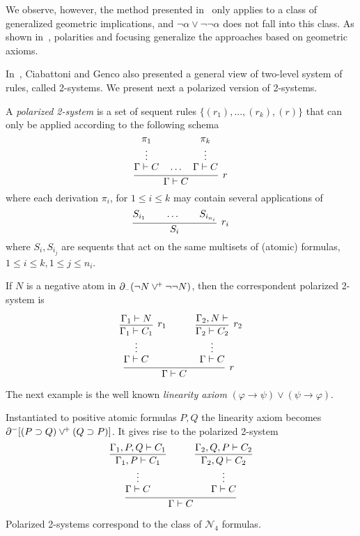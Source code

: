 We observe, however, the method presented in~\cite{Neg16}  only applies to a class of
generalized geometric implications, and $\neg \alpha\vee\neg\neg\alpha$ does not fall into this class. As shown in~\cite{DBLP:journals/apal/MarinMPV22}, polarities and focusing generalize the approaches based on geometric axioms.

In~\cite{DBLP:journals/tocl/CiabattoniG18}, Ciabattoni and Genco also presented a general view of two-level system of rules, called 2-systems. We present next a polarized version of 2-systems.
\begin{definition}
A  {\em polarized 2-system} is a set of sequent rules $\{(r_1), . . . , (r_k ), (r)\}$ that can only be applied according to the following schema
\[
\infer[r]{\Gamma\vdash C}
      {\deduce{\Gamma\vdash C\strut}
              {\deduce{\vdots}
                      {\pi_1}}\quad\ldots\quad
       \deduce{\Gamma\vdash C\strut}
              {\deduce{\vdots}
                      {\pi_k}}}
\]
where each derivation $\pi_i$, for $1\leq i \leq k$ may contain several applications of
\[
\infer[r_i]{S_i}
{S_{i_1}\qquad\ldots\qquad S_{i_{n_i}}}
\]
where $S_i,S_{i_j}$ are sequents that act on the same multisets of (atomic) formulas, $1\leq i\leq k, 1\leq j\leq n_i$. 
\end{definition}
\begin{example}
If $N$ is a negative atom in $\partial_{\scriptscriptstyle -}(\neg N \vee^{\!+} \neg\neg N)$, then the correspondent polarized 2-system is 
\[
\infer[r]{\Gamma\vdash C}
      {\deduce{\Gamma\vdash C\strut}
              {\deduce{\vdots}
                      {\infer[r_1]{\Gamma_1\vdash C_1}{\Gamma_1\vdash N}}}\quad&\quad
       \deduce{\Gamma\vdash C\strut}
              {\deduce{\vdots}
                      {\infer[r_2]{\Gamma_2\vdash C_2}
                             {\deduce{\Gamma_2,N\vdash }{}}}}}
\]
\end{example}
The next example is the well known \emph{linearity axiom} $(\varphi\to \psi)\vee (\psi\to \varphi)$.
\begin{example}\label{ex:linearity}
Instantiated to positive atomic formulas $P,Q$  the linearity axiom becomes $\partial^-[(P\supset Q)\vee^{\!+} (Q\supset P)]$. It gives rise to the polarized 2-system 
\[
\infer{\Gamma\vdash C}
      {\deduce{\Gamma\vdash C\strut}
              {\deduce{\vdots}
                      {\infer{\Gamma_1,P\vdash C_1}{\Gamma_1,P,Q\vdash C_1}}}\quad&\quad
       \deduce{\Gamma\vdash C\strut}
              {\deduce{\vdots}
                             {\infer{\Gamma_2,Q\vdash C_2}{\Gamma_2,Q,P\vdash C_2}}}}
\]
\end{example}
\begin{claim} Polarized 2-systems correspond to the class of
$\mathcal{N}_4$ formulas.
\end{claim}
